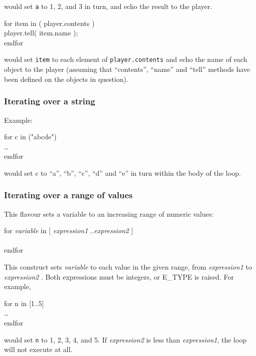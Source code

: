 would set {\tt a} to 1, 2, and 3 in turn, and echo the result to
the player.

\begin{code}
for item in ( player.contents ) \\
\ind player.tell( item.name ); \\
endfor
\end{code}

would set {\tt item} to each element of {\tt player.contents}
and echo the name of each object to the player (assuming that
``contents'', ``name'' and ``tell'' methods have been defined on the
objects in question).

\subsubsection{Iterating over a string}

Example:

\begin{code}
for c in ("abcde") \\
\ind \ldots \\
endfor
\end{code}

would set c to ``a'', ``b'', ``c'', ``d'' and ``e'' in turn within
the body of the loop.

\subsubsection{Iterating over a range of values}

This flavour sets a variable to an increasing range of numeric values:

\begin{code}
for {\em variable } in [ {\em expression1 } ..{\em expression2 } ] \\
 \\
endfor
\end{code}

This construct sets {\em variable } to each value in the given range,
from {\em expression1 } to {\em expression2 }.  Both expressions
must be integers, or {\error E\_TYPE} is raised.  For example,

\begin{code}
for n in [1..5] \\
\ind \ldots \\
endfor
\end{code}

would set {\tt n} to 1, 2, 3, 4, and 5.  If {\em expression2 } is less
than {\em expression1}, the loop will not execute at all.

